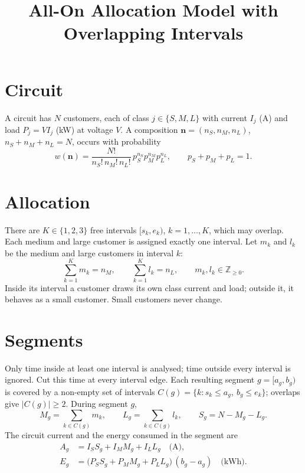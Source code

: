 \documentclass[11pt,a4paper]{article}
\title{All-On Allocation Model with Overlapping Intervals}
\author{}
\date{}
\begin{document}
\maketitle

\section{Circuit}
A circuit has \(N\) customers, each of class \(j\in\{S,M,L\}\) with current
\(I_j\) (A) and load \(P_j=V I_j\) (kW) at voltage \(V\). A composition
\(\boldsymbol n=(n_S,n_M,n_L)\), \(n_S+n_M+n_L=N\), occurs with probability
\begin{equation}
  w(\boldsymbol n)=\frac{N!}{n_S!\,n_M!\,n_L!}\,p_S^{n_S}p_M^{n_M}p_L^{n_L},
  \qquad p_S+p_M+p_L=1 .
\end{equation}

\section{Allocation}
There are \(K\in\{1,2,3\}\) free intervals \([s_k,e_k)\), \(k=1,\dots,K\),
which may overlap. Each medium and large customer is assigned exactly one
interval. Let \(m_k\) and \(l_k\) be the medium and large customers in
interval \(k\):
\begin{equation}
  \sum_{k=1}^K m_k=n_M,\qquad \sum_{k=1}^K l_k=n_L,\qquad m_k,l_k\in\mathbb{Z}_{\ge0}.
\end{equation}
Inside its interval a customer draws its own class current and load; outside
it, it behaves as a small customer. Small customers never change.

\section{Segments}
Only time inside at least one interval is analysed; time outside every
interval is ignored. Cut this time at every interval edge. Each resulting
segment \(g=[a_g,b_g)\) is covered by a non-empty set of intervals
\(C(g)=\{k: s_k\le a_g,\ b_g\le e_k\}\); overlaps give \(|C(g)|\ge2\).
During segment \(g\),
\begin{equation}
  M_g=\sum_{k\in C(g)} m_k,\qquad
  L_g=\sum_{k\in C(g)} l_k,\qquad
  S_g=N-M_g-L_g .
\end{equation}
The circuit current and the energy consumed in the segment are
\begin{align}
  A_g &= I_S S_g + I_M M_g + I_L L_g \quad\text{(A)},\\
  E_g &= \bigl(P_S S_g + P_M M_g + P_L L_g\bigr)\,(b_g-a_g) \quad\text{(kWh)}.
\end{align}
\end{document}
